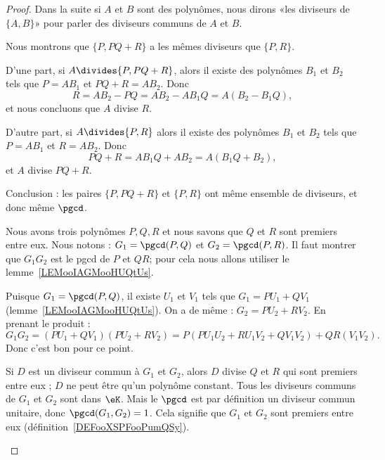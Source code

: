 \begin{proof}
	Dans la suite si \( A\) et \( B\) sont des polynômes, nous dirons «les diviseurs de \( \{ A,B \}\)» pour parler des diviseurs communs de \( A\) et \( B\).

	\begin{enumerate}

		Nous montrons que \( \{ P,PQ+R \}\) a les mêmes diviseurs que \( \{ P,R \}\).

		D'une part, si \( A\divides\{ P,PQ+R \}\), alors il existe des polynômes \( B_1\) et \( B_2\) tels que \( P=AB_1\) et \( PQ+R=AB_2\). Donc
		\begin{equation}
			R=AB_2-PQ=AB_2-AB_1Q=A(B_2-B_1Q),
		\end{equation}
		et nous concluons que \( A\) divise \( R\).

		D'autre part, si \( A\divides\{ P,R \}\) alors il existe des polynômes \( B_1\) et \( B_2\) tels que \( P=AB_1\) et \( R=AB_2\). Donc
		\begin{equation}
			PQ+R=AB_1Q+AB_2=A(B_1Q+B_2),
		\end{equation}
		et \( A\) divise \( PQ+R\).

		Conclusion : les paires \( \{ P,PQ+R \}\) et \( \{ P,R \}\) ont même ensemble de diviseurs, et donc même \( \pgcd\).


		Nous avons trois polynômes \( P,Q,R\) et nous savons que \( Q\) et \( R\) sont premiers entre eux. Nous notons : \( G_1=\pgcd(P,Q)\) et \( G_2=\pgcd(P,R)\).  Il faut montrer que \( G_1G_2\) est le pgcd de \( P\) et \( QR\); pour cela nous allons utiliser le lemme~\ref{LEMooIAGMooHUQtUs}.

		\begin{subproof}
			\spitem[\( \exists U,V\) tels que \( G_1G_2=PU+QRV\) ]

			Puisque \( G_1=\pgcd(P,Q)\), il existe \( U_1\) et \( V_1\) tels que \( G_1=PU_1+QV_1\) (lemme~\ref{LEMooIAGMooHUQtUs}).
			On a de même : \( G_2=PU_2+RV_2\). En prenant le produit :
			\begin{equation}
				G_1G_2=(PU_1+QV_1)(PU_2+RV_2)=P(PU_1U_2+RU_1V_2+QV_1V_2)+QR(V_1V_2).
			\end{equation}
			Donc c'est bon pour ce point.


			Si \( D\) est un diviseur commun à \( G_1\) et \( G_2\), alors \( D\) divise \( Q\) et \( R\) qui sont premiers entre eux ; \( D\) ne peut être qu'un polynôme constant. Tous les diviseurs communs de \( G_1\) et \( G_2\) sont dans \( \eK\). Mais le \( \pgcd\) est par définition un diviseur commun unitaire, donc \( \pgcd(G_1,G_2)=1\). Cela signifie que \( G_1\) et \( G_2\) sont premiers entre eux (définition~\ref{DEFooXSPFooPumQSy}).


\end{subproof}
\end{enumerate}
\end{proof}
